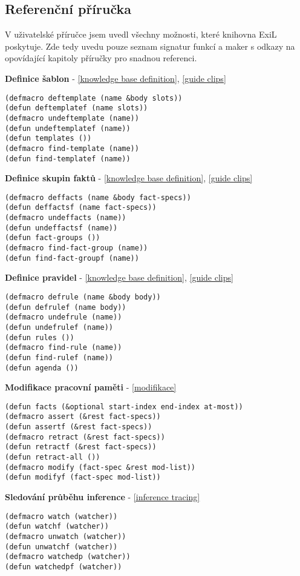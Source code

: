 \subsection{Referenční příručka}

V uživatelské příručce jsem uvedl všechny možnosti, které knihovna ExiL
poskytuje. Zde tedy uvedu pouze seznam signatur funkcí a maker s odkazy na
opovídající kapitoly příručky pro snadnou referenci.

\vspace{0.5cm}

\textbf{Definice šablon} - \ref{knowledge base definition}, \ref{guide clips}
\begin{verbatim}
(defmacro deftemplate (name &body slots))
(defun deftemplatef (name slots))
(defmacro undeftemplate (name))
(defun undeftemplatef (name))
(defun templates ())
(defmacro find-template (name))
(defun find-templatef (name))
\end{verbatim}

\textbf{Definice skupin faktů} - \ref{knowledge base definition}, \ref{guide clips}
\begin{verbatim}
(defmacro deffacts (name &body fact-specs))
(defun deffactsf (name fact-specs))
(defmacro undeffacts (name))
(defun undeffactsf (name))
(defun fact-groups ())
(defmacro find-fact-group (name))
(defun find-fact-groupf (name))
\end{verbatim}

\textbf{Definice pravidel} - \ref{knowledge base definition}, \ref{guide clips}
\begin{verbatim}
(defmacro defrule (name &body body))
(defun defrulef (name body))
(defmacro undefrule (name))
(defun undefrulef (name))
(defun rules ())
(defmacro find-rule (name))
(defun find-rulef (name))
(defun agenda ())
\end{verbatim}

\textbf{Modifikace pracovní paměti} - \ref{modifikace}
\begin{verbatim}
(defun facts (&optional start-index end-index at-most))
(defmacro assert (&rest fact-specs))
(defun assertf (&rest fact-specs))
(defmacro retract (&rest fact-specs))
(defun retractf (&rest fact-specs))
(defun retract-all ())
(defmacro modify (fact-spec &rest mod-list))
(defun modifyf (fact-spec mod-list))
\end{verbatim}

\textbf{Sledování průběhu inference} - \ref{inference tracing}
\begin{verbatim}
(defmacro watch (watcher))
(defun watchf (watcher))
(defmacro unwatch (watcher))
(defun unwatchf (watcher))
(defmacro watchedp (watcher))
(defun watchedpf (watcher))
\end{verbatim}

